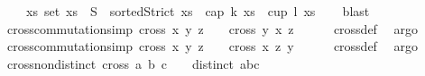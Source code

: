 \begin{isabellebody}
\ \ \ \ {\isacharparenleft}{\kern0pt}{\isasymexists}xs{\isachardot}{\kern0pt}\ {\isacharparenleft}{\kern0pt}set\ xs\ {\isasymsubseteq}\ S\ {\isasymand}\ {\isacharparenleft}{\kern0pt}sortedStrict\ xs{\isacharparenright}{\kern0pt}{\isacharparenright}{\kern0pt}\ {\isasymlongrightarrow}\ {\isacharparenleft}{\kern0pt}cap\ k\ xs\ {\isasymor}\ cup\ l\ xs{\isacharparenright}{\kern0pt}{\isacharparenright}{\kern0pt}{\isachardoublequoteclose}\isanewline
%
\isadelimproof
\ \ %
\endisadelimproof
%
\isatagproof
{}\isamarkupfalse%
\ blast%
\endisatagproof
{\isafoldproof}%
%
\isadelimproof
\isanewline
%
\endisadelimproof
\isanewline
{}\isamarkupfalse%
\ cross{}{\isacharunderscore}{\kern0pt}commutation{\isacharunderscore}{\kern0pt}{}{}{\isacharbrackleft}{\kern0pt}simp{\isacharbrackright}{\kern0pt}{\isacharcolon}{\kern0pt}\ {\isachardoublequoteopen}cross{}\ x\ y\ z\ {\isacharequal}{\kern0pt}\ {}\ {\isasymlongrightarrow}\ cross{}\ y\ x\ z\ {\isacharequal}{\kern0pt}\ {}{\isachardoublequoteclose}\isanewline
%
\isadelimproof
\ \ %
\endisadelimproof
%
\isatagproof
{}\isamarkupfalse%
\ cross{}{\isacharunderscore}{\kern0pt}def\ \isamarkupfalse%
\ argo%
\endisatagproof
{\isafoldproof}%
%
\isadelimproof
\isanewline
%
\endisadelimproof
\isanewline
{}\isamarkupfalse%
\ cross{}{\isacharunderscore}{\kern0pt}commutation{\isacharunderscore}{\kern0pt}{}{}{\isacharbrackleft}{\kern0pt}simp{\isacharbrackright}{\kern0pt}{\isacharcolon}{\kern0pt}\ {\isachardoublequoteopen}cross{}\ x\ y\ z\ {\isacharequal}{\kern0pt}\ {}\ {\isasymlongrightarrow}\ cross{}\ x\ z\ y\ {\isacharequal}{\kern0pt}\ {}{\isachardoublequoteclose}\isanewline
%
\isadelimproof
\ \ %
\endisadelimproof
%
\isatagproof
{}\isamarkupfalse%
\ cross{}{\isacharunderscore}{\kern0pt}def\ \isamarkupfalse%
\ argo%
\endisatagproof
{\isafoldproof}%
%
\isadelimproof
\isanewline
%
\endisadelimproof
\isanewline
{}\isamarkupfalse%
\ cross{}{\isacharunderscore}{\kern0pt}non{}{\isacharunderscore}{\kern0pt}distinct{\isacharcolon}{\kern0pt}\ {\isachardoublequoteopen}cross{}\ a\ b\ c\ {\isasymnoteq}\ {}\ {\isasymlongrightarrow}\ distinct\ {\isacharbrackleft}{\kern0pt}a{\isacharcomma}{\kern0pt}b{\isacharcomma}{\kern0pt}c{\isacharbrackright}{\kern0pt}{\isachardoublequoteclose}\ \isanewline

\end{isabellebody}
